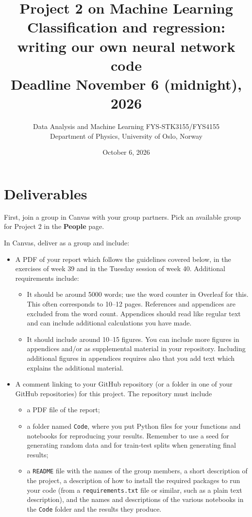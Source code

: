 \documentclass[11pt,a4paper]{article}
\title{Project 2 on Machine Learning\\[4pt]
  \large Classification and regression: writing our own neural network code\\[4pt]
  \normalsize Deadline November 6 (midnight), 2026}
\author{Data Analysis and Machine Learning FYS-STK3155/FYS4155\\
  Department of Physics, University of Oslo, Norway}
\date{October 6, 2026}
\begin{document}
\maketitle

\section*{Deliverables}

First, join a group in Canvas with your group partners.  Pick an available
group for Project 2 in the \textbf{People} page.

In Canvas, deliver as a group and include:
\begin{itemize}[nosep]
  \item A PDF of your report which follows the guidelines covered below, in
        the exercises of week 39 and in the Tuesday session of week 40.
        Additional requirements include:
  \begin{itemize}[nosep]
    \item It should be around 5000 words; use the word counter in Overleaf
          for this.  This often corresponds to 10--12 pages.  References and
          appendices are excluded from the word count.  Appendices should
          read like regular text and can include additional calculations you
          have made.
    \item It should include around 10--15 figures.  You can include more
          figures in appendices and/or as supplemental material in your
          repository.  Including additional figures in appendices requires
          also that you add text which explains the additional material.
  \end{itemize}
  \item A comment linking to your GitHub repository (or a folder in one of
        your GitHub repositories) for this project.  The repository must
        include
  \begin{itemize}[nosep]
    \item a PDF file of the report;
    \item a folder named \texttt{Code}, where you put Python files for your
          functions and notebooks for reproducing your results.  Remember to
          use a seed for generating random data and for train-test splits
          when generating final results;
    \item a \texttt{README} file with the names of the group members, a short
          description of the project, a description of how to install the
          required packages to run your code (from a
          \texttt{requirements.txt} file or similar, such as a plain text
          description), and the names and descriptions of the various
          notebooks in the \texttt{Code} folder and the results they produce.
  \end{itemize}
\end{itemize}
\end{document}
